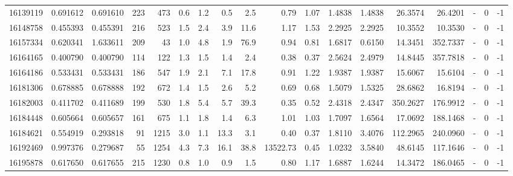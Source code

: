 \begin{tabular}{rrrrrrrrrrrrrrrlrr}
  16139119 & 0.691612 &   0.691610 &  223 &  473 &      0.6 &      1.2 &     0.5 &      2.5 &       0.79 &        1.07 &  1.4838 &  1.4838 &   26.3574 &   26.4201 &             - &        0 &         -1 \\
  16148758 & 0.455393 &   0.455391 &  216 &  523 &      1.5 &      2.4 &     3.9 &     11.6 &       1.17 &        1.53 &  2.2925 &  2.2925 &   10.3552 &   10.3530 &             - &        0 &         -1 \\
  16157334 & 0.620341 &   1.633611 &  209 &   43 &      1.0 &      4.8 &     1.9 &     76.9 &       0.94 &        0.81 &  1.6817 &  0.6150 &   14.3451 &  352.7337 &             - &        0 &         -1 \\
  16164165 & 0.400790 &   0.400790 &  114 &  122 &      1.3 &      1.5 &     1.4 &      2.4 &       0.38 &        0.37 &  2.5624 &  2.4979 &   14.8445 &  357.7818 &             - &        0 &         -1 \\
  16164186 & 0.533431 &   0.533431 &  186 &  547 &      1.9 &      2.1 &     7.1 &     17.8 &       0.91 &        1.22 &  1.9387 &  1.9387 &   15.6067 &   15.6104 &             - &        0 &         -1 \\
  16181306 & 0.678885 &   0.678888 &  192 &  672 &      1.4 &      1.5 &     2.6 &      5.2 &       0.69 &        0.68 &  1.5079 &  1.5325 &   28.6862 &   16.8194 &             - &        0 &         -1 \\
  16182003 & 0.411702 &   0.411689 &  199 &  530 &      1.8 &      5.4 &     5.7 &     39.3 &       0.35 &        0.52 &  2.4318 &  2.4347 &  350.2627 &  176.9912 &             - &        0 &         -1 \\
  16184448 & 0.605664 &   0.605657 &  161 &  675 &      1.1 &      1.8 &     1.4 &      6.3 &       1.01 &        1.03 &  1.7097 &  1.6564 &   17.0692 &  188.1468 &             - &        0 &         -1 \\
  16184621 & 0.554919 &   0.293818 &   91 & 1215 &      3.0 &      1.1 &    13.3 &      3.1 &       0.40 &        0.37 &  1.8110 &  3.4076 &  112.2965 &  240.0960 &             - &        0 &         -1 \\
  16192469 & 0.997376 &   0.279687 &   55 & 1254 &      4.3 &      7.3 &    16.1 &     38.8 &   13522.73 &        0.45 &  1.0232 &  3.5840 &   48.6145 &  117.1646 &             - &        0 &         -1 \\
  16195878 & 0.617650 &   0.617655 &  215 & 1230 &      0.8 &      1.0 &     0.9 &      1.5 &       0.80 &        1.17 &  1.6887 &  1.6244 &   14.3472 &  186.0465 &             - &        0 &         -1 \\

\end{tabular}
